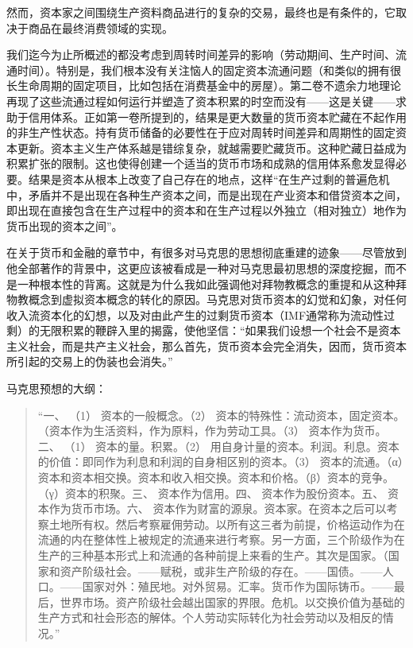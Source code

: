然而，资本家之间围绕生产资料商品进行的复杂的交易，最终也是有条件的，它取决于商品在最终消费领域的实现。

我们迄今为止所概述的都没考虑到周转时间差异的影响（劳动期间、生产时间、流通时间）。特别是，我们根本没有关注恼人的固定资本流通问题（和类似的拥有很长生命周期的固定项目，比如包括在消费基金中的房屋）。第二卷不遗余力地理论再现了这些流通过程如何运行并塑造了资本积累的时空而没有——这是关键——求助于信用体系。正如第一卷所提到的，结果是更大数量的货币资本贮藏在不起作用的非生产性状态。持有货币储备的必要性在于应对周转时间差异和周期性的固定资本更新。资本主义生产体系越是错综复杂，就越需要贮藏货币。这种贮藏日益成为积累扩张的限制。这也使得创建一个适当的货币市场和成熟的信用体系愈发显得必要。结果是资本从根本上改变了自己存在的地点，这样“在生产过剩的普遍危机中，矛盾并不是出现在各种生产资本之间，而是出现在产业资本和借贷资本之间，即出现在直接包含在生产过程中的资本和在生产过程以外独立（相对独立）地作为货币出现的资本之间”。 

在关于货币和金融的章节中，有很多对马克思的思想彻底重建的迹象——尽管放到他全部著作的背景中，这更应该被看成是一种对马克思最初思想的深度挖掘，而不是一种根本性的背离。这就是为什么我如此强调他对拜物教概念的重提和从这种拜物教概念到虚拟资本概念的转化的原因。马克思对货币资本的幻觉和幻象，对任何收入流资本化的幻想，以及对由此产生的过剩货币资本（IMF通常称为流动性过剩）的无限积累的鞭辟入里的揭露，使他坚信：“如果我们设想一个社会不是资本主义社会，而是共产主义社会，那么首先，货币资本会完全消失，因而，货币资本所引起的交易上的伪装也会消失。”

马克思预想的大纲：
\begin{quotation}
“一、 （1） 资本的一般概念。（2） 资本的特殊性：流动资本，固定资本。（资本作为生活资料，作为原料，作为劳动工具。（3） 资本作为货币。二、 （1） 资本的量。积累。（2） 用自身计量的资本。利润。利息。资本的价值：即同作为利息和利润的自身相区别的资本。（3） 资本的流通。（α）资本和资本相交换。资本和收入相交换。资本和价格。（β）资本的竞争。（γ）资本的积聚。三、 资本作为信用。四、 资本作为股份资本。五、 资本作为货币市场。六、 资本作为财富的源泉。资本家。在资本之后可以考察土地所有权。然后考察雇佣劳动。以所有这三者为前提，价格运动作为在流通的内在整体性上被规定的流通来进行考察。另一方面，三个阶级作为在生产的三种基本形式上和流通的各种前提上来看的生产。其次是国家。（国家和资产阶级社会。——赋税，或非生产阶级的存在。——国债。——人口。——国家对外：殖民地。对外贸易。汇率。货币作为国际铸币。——最后，世界市场。资产阶级社会越出国家的界限。危机。以交换价值为基础的生产方式和社会形态的解体。个人劳动实际转化为社会劳动以及相反的情况。” 

\end{quotation}

